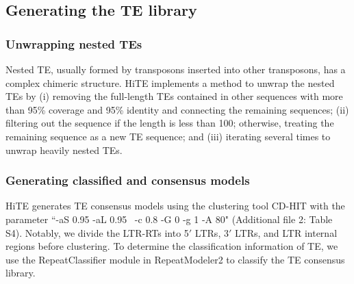 \documentclass{bmcart}
\begin{document}
\subsection*{Generating the TE library}
\subsubsection*{Unwrapping nested TEs}
Nested TE, usually formed by transposons inserted into other transposons, has a complex chimeric structure. HiTE implements a method to unwrap the nested TEs by (i) removing the full-length TEs contained in other sequences with more than 95\% coverage and 95\% identity and connecting the remaining sequences; (ii) filtering out the sequence if the length is less than 100; otherwise, treating the remaining sequence as a new TE sequence; and (iii) iterating several times to unwrap heavily nested TEs.

\subsubsection*{Generating classified and consensus models}
HiTE generates TE consensus models using the clustering tool CD-HIT\cite{li2006cd} with the parameter ``-aS 0.95 -aL 0.95  -c 0.8 -G 0 -g 1 -A 80" (Additional file 2: Table S4). Notably, we divide the LTR-RTs into 5$'$ LTRs, 3$'$ LTRs, and LTR internal regions before clustering. To determine the classification information of TE, we use the RepeatClassifier module in RepeatModeler2\cite{flynn2020repeatmodeler2} to classify the TE consensus library.




%
\end{document}
